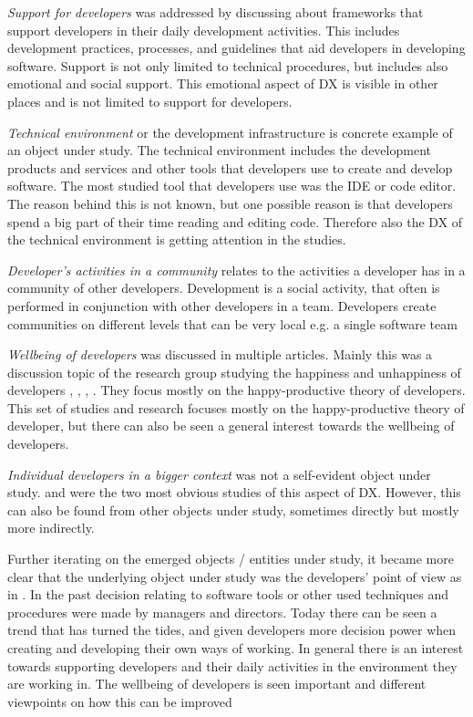 \documentclass[english, 12pt, a4paper, sci, utf8, a-1b, online]{aaltothesis}
\begin{document}
\textit{Support for developers} was addressed by discussing about frameworks that support developers in their daily development activities. This includes development practices, processes, and guidelines that aid developers in developing software. Support is not only limited to technical procedures, but includes also emotional and social support. This emotional aspect of DX is visible in other places and is not limited to support for developers.

\textit{Technical environment} or the development infrastructure is concrete example of an object under study. The technical environment includes the development products and services and other tools that developers use to create and develop software. The most studied tool that developers use was the IDE or code editor. The reason behind this is not known, but one possible reason is that developers spend a big part of their time reading and editing code. Therefore also the DX of the technical environment is getting attention in the studies.

\textit{Developer's activities in a community} relates to the activities a developer has in a community of other developers. Development is a social activity, that often is performed in conjunction with other developers in a team. Developers create communities on different levels that can be very local e.g. a single software team

\textit{Wellbeing of developers} was discussed in multiple articles. Mainly this was a discussion topic of the research group studying the happiness and unhappiness of developers \parencite{what-happens-when-unhappy}, \parencite{unhappy-developers}, \parencite{consequences-of-unhappiness}, \parencite{on-the-unhappiness}. They focus mostly on the happy-productive theory of developers. This set of studies and research focuses mostly on the happy-productive theory of developer, but there can also be seen a general interest towards the wellbeing of developers.

\textit{Individual developers in a bigger context} was not a self-evident object under study. \textcite{entering-an-ecosystem} and \textcite{fagerholm2014examining} were the two most obvious studies of this aspect of DX. However, this can also be found from other objects under study, sometimes directly but mostly more indirectly.

Further iterating on the emerged objects / entities under study, it became more clear that the underlying object under study was the developers' point of view as in \textcite{voice-of-the-developer}. In the past decision relating to software tools or other used techniques and procedures were made by managers and directors. Today there can be seen a trend that has turned the tides, and given developers more decision power when creating and developing their own ways of working. In general there is an interest towards supporting developers and their daily activities in the environment they are working in. The wellbeing of developers is seen important and different viewpoints on how this can be improved
\end{document}
